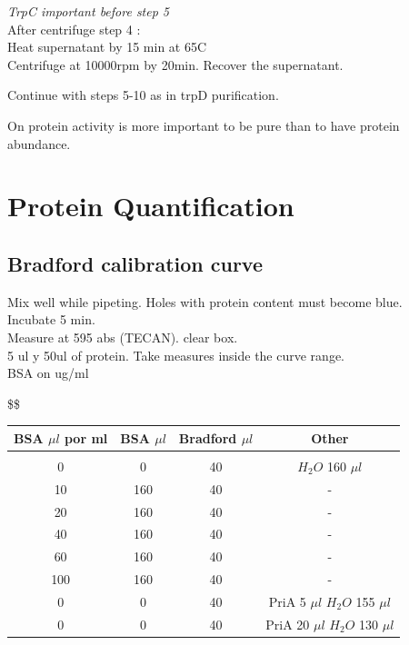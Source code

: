 \documentclass[12pt,twoside]{reedthesis}
\begin{document}
  \emph{TrpC important before step 5}\\
  After centrifuge step 4 :\\
  Heat supernatant by 15 min at 65C\\
  Centrifuge at 10000rpm by 20min. Recover the supernatant.
  
  Continue with steps 5-10 as in trpD purification.
  
  On protein activity is more important to be pure than to have protein
  abundance.
  
  \section{Protein Quantification}\label{protein-quantification}
  
  \subsection{Bradford calibration
  curve}\label{bradford-calibration-curve}
  
  Mix well while pipeting. Holes with protein content must become blue.\\
  Incubate 5 min.\\
  Measure at 595 abs (TECAN). clear box.\\
  5 ul y 50ul of protein. Take measures inside the curve range.\\
  BSA on ug/ml
  
  \$\$ \label{ScoD11_A}
  
  \begin{tabular}{c c c c}
  \hline 
  BSA $\mu l$ por ml & BSA $\mu l$ & Bradford $\mu l$ & Other \\ [1ex]
  \hline \\ [-1.5ex]  
  0                & 0      & 40 & $H_2O$ 160 $\mu l$   \\ [1 ex]
  10               & 160    & 40 &    -                 \\ [1 ex]
  20               & 160    & 40 & -                    \\ [1 ex]
  40               & 160    & 40 & -                    \\ [1 ex]
  60               & 160    & 40 &-                     \\ [1 ex]
  100              & 160    & 40 & -                    \\ [1 ex]
  0                &   0    & 40 &  PriA 5 $\mu l$   $H_2O$ 155 $\mu l$   \\ [1 ex]
  0                &   0    & 40 &  PriA 20 $\mu l$   $H_2O$ 130 $\mu l$  \\ [1 ex]
  
  \hline  
  \end {tabular}
  
\end{document}

